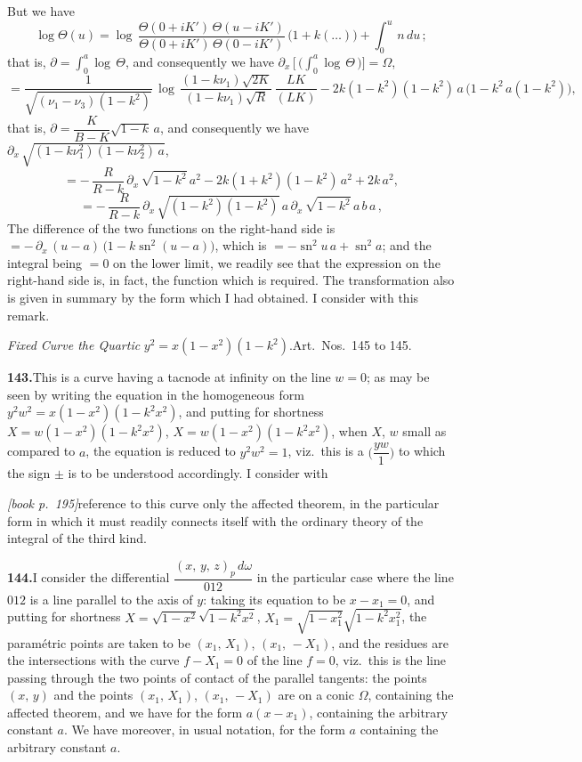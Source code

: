 \documentclass[11pt,a4paper]{article}
\DeclareMathOperator{\sn}{sn}
\begin{document}
But we have
\[
\log\Theta(u) = \log\,\frac{\Theta(0 + iK')\,\Theta(u - iK')}{\Theta(0 + iK')\,\Theta(0 - iK')}\,\bigl(1 + k(\ldots)\bigr) + \int_0^u\,n\,du\,;
\]
that is, $\partial = \int_0^a\log\,\Theta$, and consequently we have $\partial_x\,\bigl[\!\,\bigl(\!\!\int_0^a\log\,\Theta\,\bigr)\bigr] = \Omega$,
\[
= \frac{1}{\sqrt{(\nu_1 - \nu_3)(1 - k^2)}}\,\log\,\frac{(1 - k\nu_1)\sqrt{2K}}{(1 - k\nu_1)\sqrt{R}}\,\frac{LK}{(LK)} - 2k(1 - k^2)(1 - k^2)\,a\,\bigl(1 - k^2\,a(1 - k^2)\bigr),
\]
that is, $\partial = \dfrac{K}{B - K}\sqrt{1 - k}\,a$, and consequently we have $\partial_x\,\sqrt{(1 - k\nu^2_1)(1 - k\nu^2_2)\,a}$,
\[
= -\,\frac{R}{R - k}\,\partial_x\,\sqrt{1 - k^2}\,a^2 - 2 k(1 + k^2)(1 - k^2)\,a^2 + 2k\,a^2,
\]
\[
= -\,\frac{R}{R - k}\,\partial_x\,\sqrt{(1 - k^2)(1 - k^2)}\,a\,\partial_x\,\sqrt{1 - k^2}\,a\,b\,a\,,
\]
The difference of the two functions on the right-hand side is $= -\,\partial_x\,(u - a)\,\bigl(1 - k\sn^2(u - a)\bigr)$, which is $= -\sn^2 u\,a + \sn^2 a$; and the integral being $= 0$ on the lower limit, we readily see that the expression on the right-hand side is, in fact, the function which is required. The transformation also is given in summary by the form which I had obtained. I consider with this remark.

\medskip\noindent\textit{Fixed Curve the Quartic} $y^2 = x(1 - x^2)(1 - k^2)$.\quad Art.\ Nos.\ 145 to 145.

\medskip\noindent\textbf{143.}\quad This is a curve having a tacnode at infinity on the line $w = 0$; as may be seen by writing the equation in the homogeneous form $y^2w^2 = x(1 - x^2)(1 - k^2 x^2)$, and putting for shortness $X = w(1 - x^2)(1 - k^2 x^2)$, $X = w(1 - x^2)(1 - k^2 x^2)$, when $X$, $w$ small as compared to $a$, the equation is reduced to $y^2 w^2 = 1$, viz.\ this is a $\bigl(\dfrac{y w}{1}\bigr)$ to which the sign $\pm$ is to be understood accordingly. I consider with

\medskip\noindent\textit{[book p.~195]}\quad reference to this curve only the affected theorem, in the particular form in which it must readily connects itself with the ordinary theory of the integral of the third kind.

\medskip\noindent\textbf{144.}\quad I consider the differential $\dfrac{(x,\,y,\,z)_p\,d\omega}{012}$ in the particular case where the line $012$ is a line parallel to the axis of $y$: taking its equation to be $x - x_1 = 0$, and putting for shortness $X = \sqrt{1 - x^2}\sqrt{1 - k^2 x^2}$, $X_1 = \sqrt{1 - x_1^2}\sqrt{1 - k^2 x_1^2}$, the param\'etric points are taken to be $(x_1,\,X_1)$, $(x_1,\,-X_1)$, and the residues are the intersections with the curve $f - X_1 = 0$ of the line $f = 0$, viz.\ this is the line passing through the two points of contact of the parallel tangents: the points $(x,\,y)$ and the points $(x_1,\,X_1)$, $(x_1,\,-X_1)$ are on a conic $\Omega$, containing the affected theorem, and we have for the form $a(x - x_1)$, containing the arbitrary constant $a$. We have moreover, in usual notation, for the form $a$ containing the arbitrary constant $a$.
\end{document}
